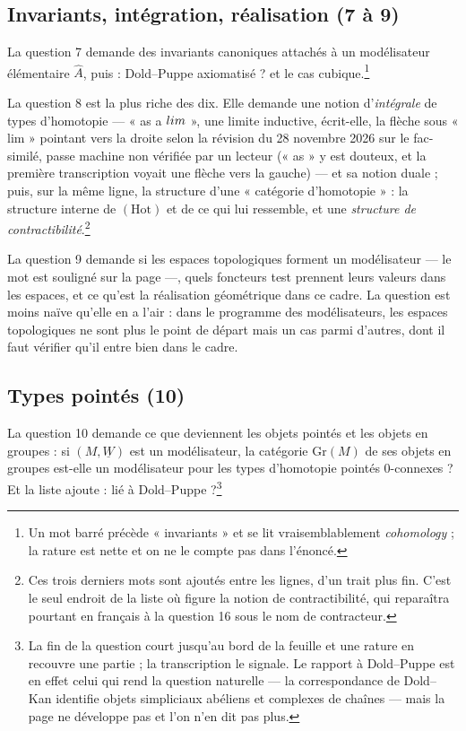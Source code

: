 \documentclass[11pt,a4paper]{article}
\begin{document}
\subsection*{Invariants, intégration, réalisation (7 à 9)}

La question 7 demande des invariants canoniques attachés à un modélisateur
élémentaire $\hat{A}$, puis : Dold--Puppe axiomatisé ? et le cas
cubique.\footnote{Un mot barré précède « invariants » et se lit
vraisemblablement \emph{cohomology} ; la rature est nette et on ne le compte
pas dans l'énoncé.}

La question 8 est la plus riche des dix. Elle demande une notion
d'\emph{intégrale} de types d'homotopie --- « as a $\varinjlim$ », une limite
inductive, écrit-elle, la flèche sous « lim » pointant vers la droite selon
la révision du 28 novembre 2026 sur le fac-similé, passe machine non vérifiée par un lecteur (« as » y est douteux, et la première transcription voyait
une flèche vers la gauche) --- et sa notion duale ; puis, sur la même ligne,
la structure d'une « catégorie d'homotopie » : la structure interne de
$(\mathrm{Hot})$ et de ce qui lui ressemble, et une \emph{structure de
contractibilité}.\footnote{Ces trois derniers mots sont ajoutés entre les
lignes, d'un trait plus fin. C'est le seul endroit de la liste où figure la
notion de contractibilité, qui reparaîtra pourtant en français à la question 16
sous le nom de contracteur.}

La question 9 demande si les espaces topologiques forment un modélisateur ---
le mot est souligné sur la page ---, quels foncteurs test prennent leurs
valeurs dans les espaces, et ce qu'est la réalisation géométrique dans ce
cadre. La question est moins naïve qu'elle en a l'air : dans le programme des
modélisateurs, les espaces topologiques ne sont plus le point de départ mais un
cas parmi d'autres, dont il faut vérifier qu'il entre bien dans le cadre.

\subsection*{Types pointés (10)}

La question 10 demande ce que deviennent les objets pointés et les objets en
groupes : si $(M, \underline{W})$ est un modélisateur, la catégorie
$\mathrm{Gr}(M)$ de ses objets en groupes est-elle un modélisateur pour les
types d'homotopie pointés 0-connexes ? Et la liste ajoute : lié à
Dold--Puppe ?\footnote{La fin de la question court jusqu'au bord de la feuille
et une rature en recouvre une partie ; la transcription le signale. Le rapport
à Dold--Puppe est en effet celui qui rend la question naturelle --- la
correspondance de Dold--Kan identifie objets simpliciaux abéliens et complexes
de chaînes --- mais la page ne développe pas et l'on n'en dit pas plus.}
\end{document}
